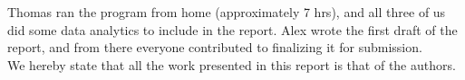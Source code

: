 \documentclass[12pt]{article}
\begin{document}
Thomas ran the program from home (approximately 7 hrs), and all three of us did some data analytics to include in the report. Alex wrote the first draft of the report, and from there everyone contributed to finalizing it for submission.\\

We hereby state that all the work presented in this report is that of the authors.












\end{document}
